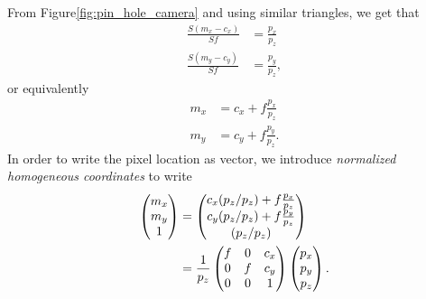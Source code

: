From Figure\ref{fig:pin_hole_camera} and using similar triangles, we get that
\begin{align*}
\frac{S(m_x-c_x)}{Sf} &= \frac{p_x}{p_z} \\	
\frac{S(m_y-c_y)}{Sf} &= \frac{p_y}{p_z},
\end{align*}
or equivalently
\begin{align*}
m_x &= c_x + f\frac{p_x}{p_z} \\	
m_y &= c_y + f\frac{p_y}{p_z}.
\end{align*}
In order to write the pixel location as vector, we introduce {\em normalized homogeneous coordinates} to write
\begin{align}
\begin{pmatrix}m_x \\ m_y \\ 1\end{pmatrix} 
	&= \begin{pmatrix} c_x(p_z/p_z) + f\frac{p_x}{p_z} \\ c_y(p_z/p_z) + f\frac{p_y}{p_z} \\ (p_z/p_z) \end{pmatrix} \notag \\
	&= \frac{1}{p_z}\begin{pmatrix} f & 0 & c_x \\ 0 & f & c_y \\ 0 & 0 & 1 \end{pmatrix}\begin{pmatrix}p_x \\ p_y \\ p_z \end{pmatrix}.
	\label{eq:intrinsic_parameters_1}
\end{align}

